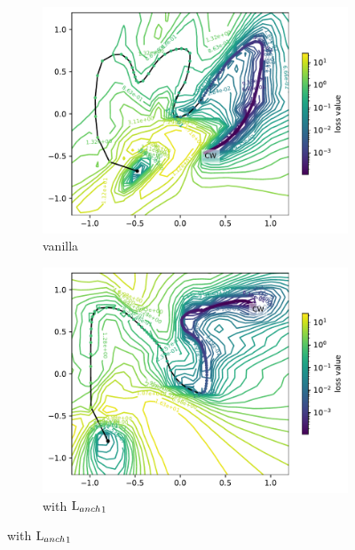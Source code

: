 \documentclass[letterpaper]{article} %
\begin{document}
                        
        \begin{figure}[htb]
              \centering
              \begin{subfigure}[b]{0.3\textwidth}
                \includegraphics[width=\textwidth]{figures/round3/vanilla/map_residual_train_loss_loss.pdf}
                \caption{vanilla}
                \label{fig:constraintsvanilla}
              \end{subfigure}
              \hfill
            \begin{subfigure}[b]{0.3\textwidth}
                \includegraphics[width=\textwidth]{figures/round3/anch1/map_residual_train_loss_loss.pdf}
                \caption{with ${\text{L}_{anch}}_1$}
                \label{fig:constraintspolar}

\end{subfigure}
\end{figure}
\end{document}
